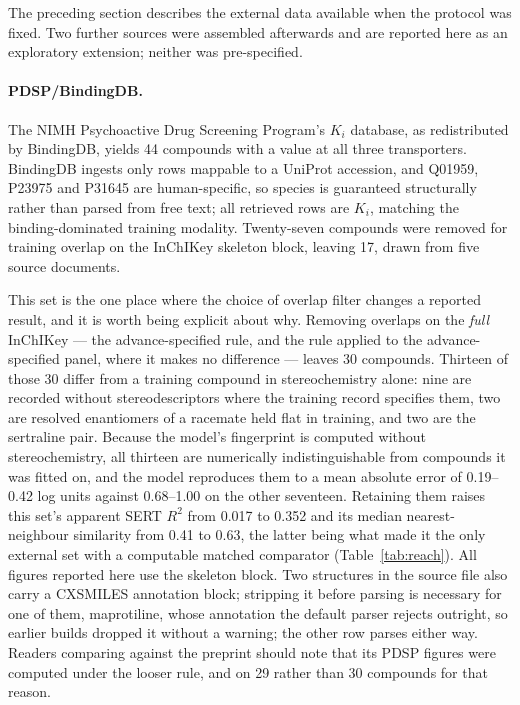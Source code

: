 \documentclass[11pt,a4paper]{article}
\begin{document}
The preceding section describes the external data available when the protocol was
fixed. Two further sources were assembled afterwards and are reported here as an
exploratory extension; neither was pre-specified.

\paragraph{PDSP/BindingDB.} The NIMH Psychoactive Drug Screening Program's $K_i$ database,
as redistributed by BindingDB, yields 44 compounds with a value at all three transporters.
BindingDB ingests only rows mappable to a UniProt accession, and Q01959, P23975 and P31645
are human-specific, so species is guaranteed structurally rather than parsed from free
text; all retrieved rows are $K_i$, matching the binding-dominated training modality.
Twenty-seven compounds were removed for training overlap on the InChIKey skeleton block,
leaving 17, drawn from five source documents.

This set is the one place where the choice of overlap filter changes a reported result,
and it is worth being explicit about why. Removing overlaps on the \emph{full} InChIKey
--- the advance-specified rule, and the rule applied to the advance-specified panel, where it
makes no difference --- leaves 30 compounds. Thirteen of those 30 differ from a training
compound in stereochemistry alone: nine are recorded without stereodescriptors where the
training record specifies them, two are resolved enantiomers of a racemate held flat in
training, and two are the sertraline pair. Because the model's fingerprint is computed
without stereochemistry, all thirteen are numerically indistinguishable from compounds
it was fitted on, and the model reproduces them to a mean absolute error of 0.19--0.42
log units against 0.68--1.00 on the other seventeen. Retaining them raises this set's
apparent SERT $R^2$ from 0.017 to 0.352 and its median nearest-neighbour similarity from
0.41 to 0.63, the latter being what made it the only external set with a computable
matched comparator (Table~\ref{tab:reach}). All figures reported here use the skeleton
block. Two structures in the source file also carry a CXSMILES annotation block; stripping it
before parsing is necessary for one of them,
maprotiline, whose annotation the default parser rejects outright, so earlier builds
dropped it without a warning; the other row parses either way. Readers comparing against
the preprint should note that its PDSP figures were computed under the looser rule, and on
29 rather than 30 compounds for that reason.
\end{document}
